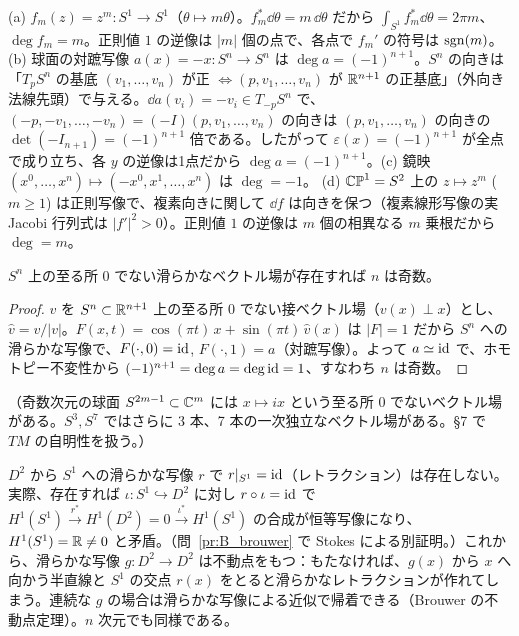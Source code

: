 \begin{ex}[例]\label{B:ex:degex}
(a) $f_m(z)=z^m:S^1\to S^1$（$\theta\mapsto m\theta$）。$f_m^*\dd\theta=m\,\dd\theta$ だから $\int_{S^1}f_m^*\dd\theta=2\pi m$、$\deg f_m=m$。正則値 $1$ の逆像は $|m|$ 個の点で、各点で $f_m'$ の符号は $\operatorname{sgn}(m)$。
(b) 球面の対蹠写像 $a(x)=-x:S^n\to S^n$ は $\deg a=(-1)^{n+1}$。$S^n$ の向きは「$T_pS^n$ の基底 $(v_1,\dots,v_n)$ が正 $\iff(p,v_1,\dots,v_n)$ が $\mathbb R^{n+1}$ の正基底」（外向き法線先頭）で与える。$\dd a(v_i)=-v_i\in T_{-p}S^n$ で、$(-p,-v_1,\dots,-v_n)=(-I)(p,v_1,\dots,v_n)$ の向きは $(p,v_1,\dots,v_n)$ の向きの $\det(-I_{n+1})=(-1)^{n+1}$ 倍である。したがって $\varepsilon(x)=(-1)^{n+1}$ が全点で成り立ち、各 $y$ の逆像は1点だから $\deg a=(-1)^{n+1}$。(c) 鏡映 $(x^0,\dots,x^n)\mapsto(-x^0,x^1,\dots,x^n)$ は $\deg=-1$。
(d) $\mathbb{CP}^1=S^2$ 上の $z\mapsto z^m$ ($m\ge1$) は正則写像で、複素向きに関して $\dd f$ は向きを保つ（複素線形写像の実 Jacobi 行列式は $|f'|^2>0$）。正則値 $1$ の逆像は $m$ 個の相異なる $m$ 乗根だから $\deg=m$。
\end{ex}

\begin{thm}\label{B:thm:hairy}\tP
$S^n$ 上の至る所 $0$ でない滑らかなベクトル場が存在すれば $n$ は奇数。
\end{thm}
\begin{proof}
$v$ を $S^n\subset\mathbb R^{n+1}$ 上の至る所 $0$ でない接ベクトル場（$v(x)\perp x$）とし、$\hat v=v/|v|$。$F(x,t)=\cos(\pi t)\,x+\sin(\pi t)\,\hat v(x)$ は $|F|=1$ だから $S^n$ への滑らかな写像で、$F(\cdot,0)=\mathrm{id}$, $F(\cdot,1)=a$（対蹠写像）。よって $a\simeq\mathrm{id}$ で、ホモトピー不変性から $(-1)^{n+1}=\deg a=\deg\mathrm{id}=1$、すなわち $n$ は奇数。
\end{proof}
（奇数次元の球面 $S^{2m-1}\subset\mathbb C^m$ には $x\mapsto ix$ という至る所 $0$ でないベクトル場がある。$S^3,S^7$ ではさらに 3 本、7 本の一次独立なベクトル場がある。§7 で $TM$ の自明性を扱う。）

\begin{ex}\label{B:ex:brouwer}
$D^2$ から $S^1$ への滑らかな写像 $r$ で $r|_{S^1}=\mathrm{id}$（レトラクション）は存在しない。実際、存在すれば $\iota:S^1\hookrightarrow D^2$ に対し $r\circ\iota=\mathrm{id}$ で $H^1(S^1)\xrightarrow{r^*}H^1(D^2)=0\xrightarrow{\iota^*}H^1(S^1)$ の合成が恒等写像になり、$H^1(S^1)=\mathbb R\ne0$ と矛盾。（問~\ref{pr:B_brouwer} で Stokes による別証明。）これから、滑らかな写像 $g:D^2\to D^2$ は不動点をもつ：もたなければ、$g(x)$ から $x$ へ向かう半直線と $S^1$ の交点 $r(x)$ をとると滑らかなレトラクションが作れてしまう。連続な $g$ の場合は滑らかな写像による近似で帰着できる（Brouwer の不動点定理）。$n$ 次元でも同様である。
\end{ex}

